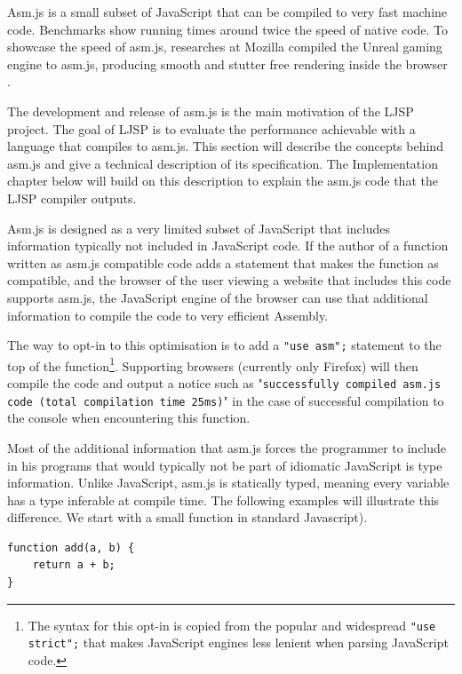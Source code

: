 \documentclass[11pt]{report}
\begin{document}
Asm.js is a small subset of JavaScript that can be compiled to very fast machine code. Benchmarks show \cite{asmjsbenchmark} running times around twice the speed of native code. To showcase the speed of asm.js, researches at Mozilla compiled the Unreal gaming engine to asm.js, producing smooth and stutter free rendering inside the browser \cite{unreal}.

The development and release of asm.js is the main motivation of the LJSP project. The goal of LJSP is to evaluate the performance achievable with a language that compiles to asm.js. This section will describe the concepts behind asm.js and give a technical description of its specification. The Implementation chapter below will build on this description to explain the asm.js code that the LJSP compiler outputs.

Asm.js is designed as a very limited subset of JavaScript that includes information typically not included in JavaScript code. If the author of a function written as asm.js compatible code adds a statement that makes the function as compatible, and the browser of the user viewing a website that includes this code supports asm.js, the JavaScript engine of the browser can use that additional information to compile the code to very efficient Assembly.

The way to opt-in to this optimisation is to add a \texttt{"use asm";} statement to the top of the function\footnote{The syntax for this opt-in is copied from the popular and widespread \texttt{"use strict";} that makes JavaScript engines less lenient when parsing JavaScript code.}. Supporting browsers (currently only Firefox) will then compile the code and output a notice such as "\texttt{successfully compiled asm.js code (total compilation time 25ms)}" in the case of successful compilation to the console when encountering this function.

Most of the additional information that asm.js forces the programmer to include in his programs that would typically not be part of idiomatic JavaScript is type information. Unlike JavaScript, asm.js is statically typed, meaning every variable has a type inferable at compile time. The following examples will illustrate this difference. We start with a small function in standard Javascript).

\begin{lstlisting}
function add(a, b) {
    return a + b;
}
\end{lstlisting}
\end{document}
